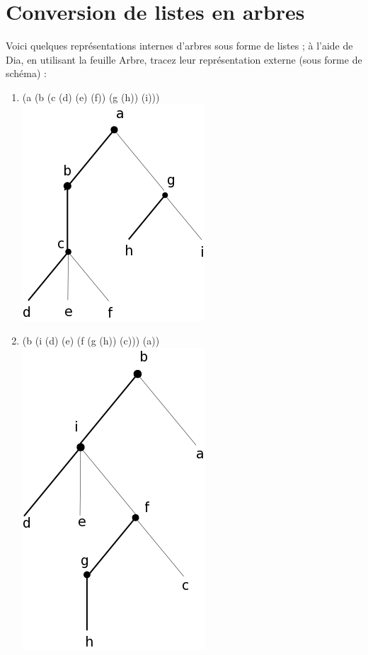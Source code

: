 \documentclass[a4paper, 11pt]{article}
\begin{document}
\section{Conversion de listes en arbres}
Voici quelques représentations internes d'arbres sous forme de listes ; à l'aide de Dia, en utilisant la feuille Arbre, tracez leur représentation externe (sous forme de schéma) :
\begin{enumerate}
    \item (a (b (c (d) (e) (f)) (g (h)) (i)))\\\includegraphics[scale=0.3]{reponse1.png}
    \item (b (i (d) (e) (f (g (h)) (c))) (a))\\\includegraphics[scale=0.3]{reponse2.png}

\end{enumerate}
\end{document}
